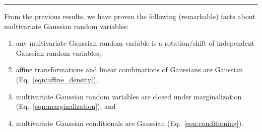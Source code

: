 \documentclass[11pt,letterpaper]{article}
\newcommand{\sectionbreak}{%
  \vspace{1em}
  \hrule
}
\begin{document}
\sectionbreak

From the previous results, we have proven the following (remarkable) facts about multivariate Gaussian random variables:
%
\begin{enumerate}
  \item any multivariate Gaussian random variable is a rotation/shift of independent Gaussian random variables,
  \item affine transformations and linear combinations of Gaussians are Gaussian (Eq.~\ref{eqn:affine_density}),
  \item multivariate Gaussian random variables are closed under marginalization (Eq.~\ref{eqn:marginalization}), and
  \item multivariate Gaussian conditionals are Gaussian (Eq.~\ref{eqn:conditioning}).
\end{enumerate}
\end{document}
